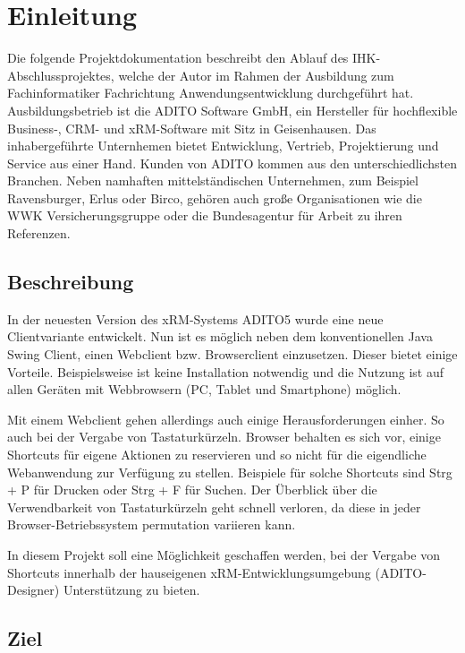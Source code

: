 \setcounter{page}{1}
\section{Einleitung}

Die folgende Projektdokumentation beschreibt den Ablauf des IHK-Abschlussprojektes, welche der Autor im Rahmen der Ausbildung zum Fachinformatiker Fachrichtung Anwendungsentwicklung
durchgeführt hat. Ausbildungsbetrieb ist die ADITO Software GmbH, ein Hersteller für hochflexible Business-, CRM- und xRM-Software mit Sitz in Geisenhausen. Das inhabergeführte Unternhemen bietet Entwicklung, Vertrieb, Projektierung und Service aus einer Hand. Kunden von ADITO kommen aus den unterschiedlichsten Branchen. Neben namhaften mittelständischen Unternehmen, zum Beispiel Ravensburger, Erlus oder Birco, gehören auch große Organisationen wie die WWK Versicherungsgruppe oder die Bundesagentur für Arbeit zu ihren Referenzen.

\subsection{Beschreibung}
 
In der neuesten Version des xRM-Systems ADITO5 wurde eine neue Clientvariante entwickelt. Nun ist es möglich neben dem konventionellen Java Swing Client, einen Webclient bzw. Browserclient einzusetzen. Dieser bietet einige Vorteile. Beispielsweise ist keine Installation notwendig und die Nutzung ist auf allen Geräten mit Webbrowsern (PC, Tablet und Smartphone) möglich. 

Mit einem Webclient gehen allerdings auch einige Herausforderungen einher. So auch bei der Vergabe von Tastaturkürzeln. Browser behalten es sich vor, einige Shortcuts für eigene Aktionen zu reservieren und so nicht für die eigendliche Webanwendung zur Verfügung zu stellen. Beispiele für solche Shortcuts sind Strg + P für Drucken oder Strg + F für Suchen. Der Überblick über die Verwendbarkeit von Tastaturkürzeln geht schnell verloren, da diese in jeder Browser-Betriebssystem permutation variieren kann.

In diesem Projekt soll eine Möglichkeit geschaffen werden, bei der Vergabe von Shortcuts innerhalb der hauseigenen xRM-Entwicklungsumgebung (ADITO-Designer) Unterstützung zu bieten.

\subsection{Ziel}

